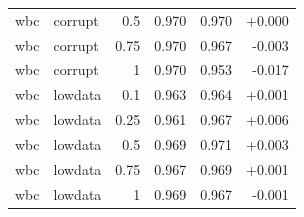 \begin{table}[t]
\begin{tabular}{llrrrr}
wbc & corrupt & 0.5 & 0.970 & 0.970 & +0.000 \\
wbc & corrupt & 0.75 & 0.970 & 0.967 & -0.003 \\
wbc & corrupt & 1 & 0.970 & 0.953 & -0.017 \\
wbc & lowdata & 0.1 & 0.963 & 0.964 & +0.001 \\
wbc & lowdata & 0.25 & 0.961 & 0.967 & +0.006 \\
wbc & lowdata & 0.5 & 0.969 & 0.971 & +0.003 \\
wbc & lowdata & 0.75 & 0.967 & 0.969 & +0.001 \\
wbc & lowdata & 1 & 0.969 & 0.967 & -0.001 \\
\bottomrule
\end{tabular}
\end{table}